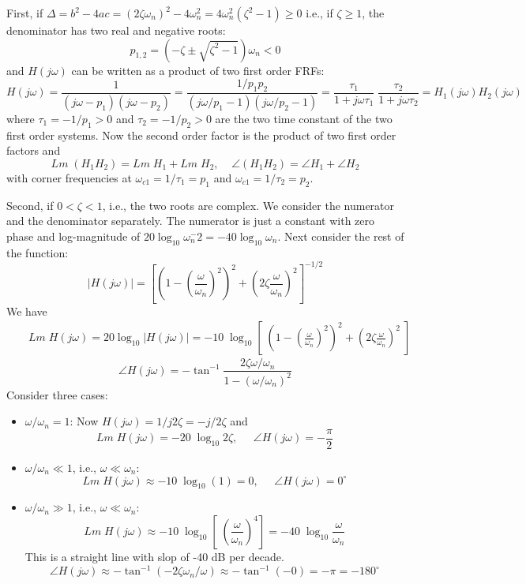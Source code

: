 \begin{enumerate}
  First, if $\Delta=b^2-4ac=(2\zeta\omega_n)^2-4\omega_n^2=4\omega^2_n(\zeta^2-1)\ge 0$
  i.e., if $\zeta\ge 1$, the denominator has two real and negative roots:
  \[ p_{1,2}=(-\zeta\pm\sqrt{\zeta^2-1})\omega_n < 0 \]
  and $H(j\omega)$ can be written as a product of two first order FRFs:
  \[ H(j\omega)=\frac{1}{(j\omega-p_1)(j\omega-p_2)} 
  =\frac{1/p_1p_2}{(j\omega/p_1-1)(j\omega/p_2-1)} 
  =\frac{\tau_1}{1+j\omega\tau_1}\;\frac{\tau_2}{1+j\omega\tau_2}
  =H_1(j\omega)H_2(j\omega) \]
  where $\tau_1=-1/p_1>0$ and $\tau_2=-1/p_2>0$ are the two time constant of the two
  first order systems. Now the second order factor is the product of two first order 
  factors and
  \[ Lm\;(H_1 H_2)=Lm\; H_1+Lm\; H_2,\;\;\;\;\angle (H_1 H_2)=\angle H_1+\angle H_2 \]
  with corner frequencies at $\omega_{c1}=1/\tau_1=p_1$ and $\omega_{c1}=1/\tau_2=p_2$.

  Second, if $0<\zeta<1$, i.e., the two roots are complex. We consider the numerator 
  and the denominator separately. The numerator is just a constant with zero phase and
  log-magnitude of $20\log_{10} \omega_n^{-}2=-40\log_{10} \omega_n$. Next consider the
  rest of the function:
  \[ |H(j\omega)|=[(1-(\frac{\omega}{\omega_n})^2)^2+(2\zeta\frac{\omega}{\omega_n})^2]^{-1/2}\]
  We have
  \begin{eqnarray}
    && Lm\;H(j\omega)=20\log_{10} |H(j\omega)|
    =-10\;\log_{10}[\; (1-(\frac{\omega}{\omega_n})^2)^2+(2\zeta\frac{\omega}{\omega_n})^2\;]
    \nonumber 
  \end{eqnarray}
  \[ \angle H(j\omega)=-\tan^{-1}\frac{2\zeta\omega/\omega_n}{1-(\omega/\omega_n)^2} \]
  Consider three cases:
  \begin{itemize}
  \item $\omega/\omega_n=1$:
    Now $H(j\omega)=1/j2\zeta=-j/2\zeta$ and 
    \[ Lm\;H(j\omega)=-20\;\log_{10} 2\zeta,\;\;\;\;\;\angle H(j\omega)=-\frac{\pi}{2} \]
  \item $\omega/\omega_n\ll 1$, i.e., $\omega \ll \omega_n$:
    \[ Lm\;H(j\omega) \approx -10\;\log_{10} (1)=0,\;\;\;\;\;\angle H(j\omega)=0^\circ \]
  \item $\omega/\omega_n\gg 1$, i.e., $\omega \ll \omega_n$:
    \[ Lm\;H(j\omega)\approx-10\;\log_{10}[\; (\frac{\omega}{\omega_n})^4 ]
    =-40 \;\log_{10} \frac{\omega}{\omega_n}    \]
    This is a straight line with slop of -40 dB per decade.
    \[ \angle H(j\omega) \approx -\tan^{-1} (-2\zeta \omega_n/\omega)
    \approx -\tan^{-1} (-0)=-\pi=-180^\circ \]
  \end{itemize}

\end{enumerate}

